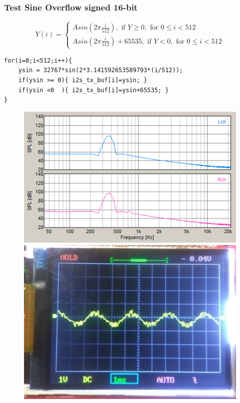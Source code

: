 \documentclass[table,dvipsnames,10pt]{beamer}
\begin{document}
	\begin{frame}[fragile]
	\frametitle{Test Sine Overflow signed 16-bit}
	\begin{exampleblock}{}
		\[
		Y(i) =
		\begin{cases}
		A sin(2 \pi \frac{i}{512}), \text{ if } Y \geq 0, \text{ for } 0 \leq i < 512\\
		A sin(2 \pi \frac{i}{512})+65535, \text{ if } Y < 0, \text{ for } 0 \leq i < 512
		\end{cases}
		\]
	\end{exampleblock}
	\begin{exampleblock}{}
		\begin{verbatim}
for(i=0;i<512;i++){
	ysin = 32767*sin(2*3.141592653589793*(i/512));
	if(ysin >= 0){ i2s_tx_buf[i]=ysin; }
	if(ysin <0  ){ i2s_tx_buf[i]=ysin+65535; }
}
		\end{verbatim}
	\end{exampleblock}
	\begin{exampleblock}{}
		\begin{figure}[H]
			\centering
			\includegraphics[width=0.45\linewidth]{result/day_4/newsine400fft}
			\includegraphics[width=0.4\linewidth]{result/day_4/goodsine2}
		\end{figure}
	\end{exampleblock}
	\end{frame}
\end{document}
